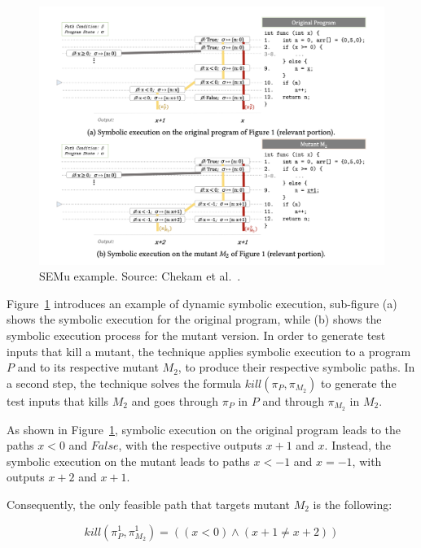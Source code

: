 \begin{figure}[tb]
\begin{center}
\includegraphics[width=\textwidth]{images/semu-example}
\caption{SEMu example. Source: Chekam et al.~\cite{chekam2021killing}.}
\label{fig:semu-example}
\end{center}
\end{figure}

Figure~\ref{fig:semu-example} introduces an example of dynamic symbolic execution, sub-figure (a) shows the symbolic execution for the original program, while (b) shows the symbolic execution process for the mutant version. In order to generate test inputs that kill a mutant, the technique applies symbolic execution to a program $P$ and to its respective mutant $M_2$, to produce their respective symbolic paths. In a second step, the technique solves the formula $kill(\pi_P, \pi_{M_2})$ to generate the test inputs that kills $M_2$ and goes through $\pi_P$ in $P$ and through $\pi_{M_2}$ in $M_2$. 

As shown in Figure~\ref{fig:semu-example}, symbolic execution on the original program leads to the paths $x < 0$ and $False$, with the respective outputs $x + 1$ and $x$.
Instead, the symbolic execution on the mutant leads to paths $x < -1$ and $x = -1$, with outputs $x + 2$ and $x + 1$.

Consequently, the only feasible path that targets mutant $M_2$ is the following:

\begin{equation}
	kill(\pi_{P}^{1}, \pi_{M_2}^{1}) = ((x < 0) \wedge (x + 1 \neq x + 2) )
\end{equation}

